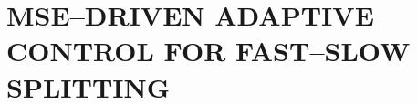 \documentclass{article}
\begin{document}



\section{MSE--DRIVEN ADAPTIVE CONTROL FOR FAST--SLOW SPLITTING}
\end{document}
